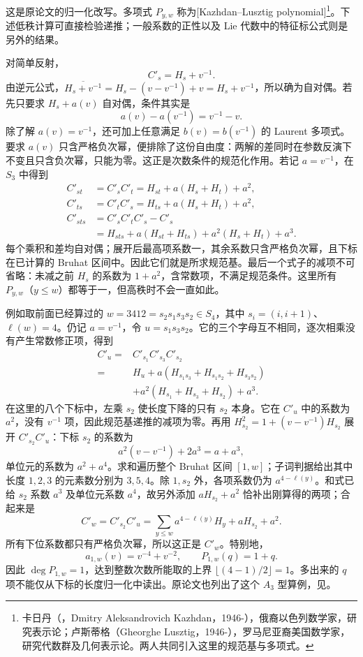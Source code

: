 这是原论文\cite[Theorem 1.1, equivalent formulation (1.1.c), p. 166]{KazhdanLusztig1979Hecke}的归一化改写。多项式 \(P_{y,w}\) 称为[Kazhdan--Lusztig polynomial]\footnote{卡日丹（，Dmitry Aleksandrovich Kazhdan，1946-），俄裔以色列数学家，研究表示论；卢斯蒂格（Gheorghe Lusztig，1946-），罗马尼亚裔美国数学家，研究代数群及几何表示论。两人共同引入这里的规范基与多项式。}。下述低秩计算可直接检验递推；一般系数的正性以及 Lie 代数中的特征标公式则是另外的结果。

\ProseParagraphBreak
对简单反射，
\[
	C'_s=H_s+v^{-1}.
\]
由逆元公式，\(\overline{H_s+v^{-1}}=H_s-(v-v^{-1})+v=H_s+v^{-1}\)，所以确为自对偶。若先只要求 \(H_s+a(v)\) 自对偶，条件其实是
\[
	a(v)-a(v^{-1})=v^{-1}-v.
\]
除了解 \(a(v)=v^{-1}\)，还可加上任意满足 \(b(v)=b(v^{-1})\) 的 Laurent 多项式。要求 \(a(v)\) 只含严格负次幂，便排除了这份自由度：两解的差同时在参数反演下不变且只含负次幂，只能为零。这正是次数条件的规范化作用。若记 \(a=v^{-1}\)，在 \(S_3\) 中得到
\begin{align*}
	C'_{st}&=C'_sC'_t =H_{st}+a(H_s+H_t)+a^2,\\
	C'_{ts}&=C'_tC'_s =H_{ts}+a(H_s+H_t)+a^2,\\
	C'_{sts}&=C'_sC'_tC'_s-C'_s\\
	&=H_{sts}+a(H_{st}+H_{ts})+a^2(H_s+H_t)+a^3.
\end{align*}
每个乘积和差均自对偶；展开后最高项系数一，其余系数只含严格负次幂，且下标在已计算的 Bruhat 区间中。因此它们就是所求规范基。最后一个式子的减项不可省略：未减之前 \(H_s\) 的系数为 \(1+a^2\)，含常数项，不满足规范条件。这里所有 \(P_{y,w}\)（\(y\le w\)）都等于一，但高秩时不会一直如此。

\ProseParagraphBreak
例如取前面已经算过的 \(w=3412=s_2s_1s_3s_2\in S_4\)，其中 \(s_i=(i,i+1)\)、\(\ell(w)=4\)。仍记 \(a=v^{-1}\)，令 \(u=s_1s_3s_2\)。它的三个字母互不相同，逐次相乘没有产生常数修正项，得到
\begin{align*}
	C'_u={}&C'_{s_1}C'_{s_3}C'_{s_2}\\
	={}&H_u+a(H_{s_1s_3}+H_{s_1s_2}+H_{s_3s_2})\\
	&+a^2(H_{s_1}+H_{s_3}+H_{s_2})+a^3.
\end{align*}
在这里的八个下标中，左乘 \(s_2\) 使长度下降的只有 \(s_2\) 本身。它在 \(C'_u\) 中的系数为 \(a^2\)，没有 \(v^{-1}\) 项，因此规范基递推的减项为零。再用 \(H_{s_2}^2=1+(v-v^{-1})H_{s_2}\) 展开 \(C'_{s_2}C'_u\)：下标 \(s_2\) 的系数为
\[
	a^2(v-v^{-1})+2a^3=a+a^3,
\]
单位元的系数为 \(a^2+a^4\)。求和遍历整个 Bruhat 区间 \([1,w]\)；子词判据给出其中长度 \(1,2,3\) 的元素数分别为 \(3,5,4\)。除 \(1,s_2\) 外，各项系数仍为 \(a^{4-\ell(y)}\)。和式已给 \(s_2\) 系数 \(a^3\) 及单位元系数 \(a^4\)，故另外添加 \(aH_{s_2}+a^2\) 恰补出刚算得的两项；合起来是
\[
	C'_w=C'_{s_2}C'_u =\sum_{y\le w}a^{4-\ell(y)}H_y+aH_{s_2}+a^2.
\]
所有下位系数都只有严格负次幂，所以这正是 \(C'_w\)。特别地，
\[
	a_{1,w}(v)=v^{-4}+v^{-2},\qquad P_{1,w}(q)=1+q.
\]
因此 \(\deg P_{1,w}=1\)，达到整数次数所能取的上界 \(\lfloor(4-1)/2\rfloor=1\)。多出来的 \(q\) 项不能仅从下标的长度归一化中读出。原论文也列出了这个 \(A_3\) 型算例，见\cite[Section 6, Example 6.1, p. 177]{KazhdanLusztig1979Hecke}。

